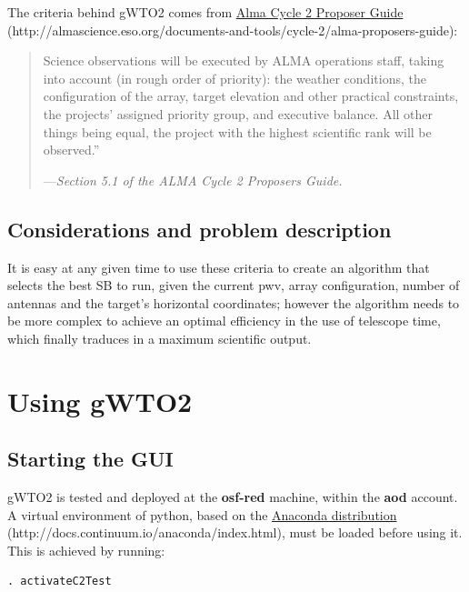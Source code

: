 \documentclass[a4paper,10pt,english]{sphinxmanual}
\begin{document}
The criteria behind gWTO2 comes from \href{http://almascience.eso.org/documents-and-tools/cycle-2/alma-proposers-guide}{Alma Cycle 2 Proposer Guide} (http://almascience.eso.org/documents-and-tools/cycle-2/alma-proposers-guide):
\begin{quote}

Science observations will be executed by ALMA operations staff, taking into
account (in rough order of priority): the weather conditions,
the configuration of the array, target elevation and other practical
constraints, the projects’ assigned priority group, and executive balance.
All other things being equal, the project with the highest scientific rank
will be observed.''

\begin{flushright}
---\emph{Section 5.1 of the ALMA Cycle 2 Proposers Guide.}
\end{flushright}
\end{quote}


\section{Considerations and problem description}
\label{intro2:considerations-and-problem-description}
It is easy at any given time to use these criteria to create an algorithm that
selects the best SB to run, given the current pwv, array configuration,
number of antennas and the target's horizontal coordinates; however the
algorithm needs to be more complex to achieve an optimal efficiency in the use
of telescope time, which finally traduces in a maximum scientific output.


\chapter{Using gWTO2}
\label{usingwto:using-gwto2}\label{usingwto::doc}

\section{Starting the GUI}
\label{usingwto:starting-the-gui}
gWTO2 is tested and deployed at the \textbf{osf-red} machine, within the \textbf{aod} account.
A virtual environment of python, based on the
\href{http://docs.continuum.io/anaconda/index.html}{Anaconda distribution} (http://docs.continuum.io/anaconda/index.html),
must be loaded before using it. This is achieved by running:

\begin{Verbatim}[commandchars=\\\{\}]
. activateC2Test
\end{Verbatim}
\end{document}

